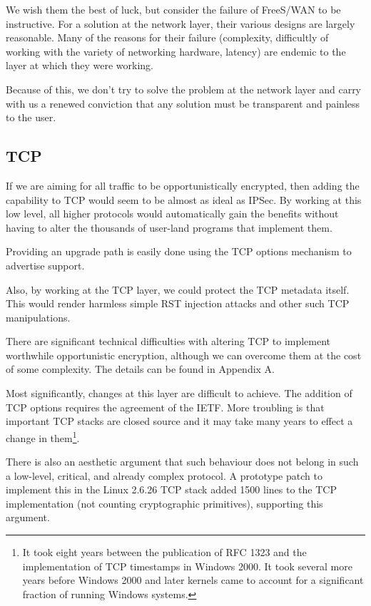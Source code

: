 \documentclass[conference]{IEEEtran}
\begin{document}
We wish them the best of luck, but consider the failure of FreeS/WAN to be
instructive. For a solution at the network layer, their various designs are
largely reasonable. Many of the reasons for their failure (complexity,
difficultly of working with the variety of networking hardware, latency) are
endemic to the layer at which they were working.

Because of this, we don't try to solve the problem at the network layer and
carry with us a renewed conviction that any solution must be transparent and
painless to the user.

\subsection{TCP}

If we are aiming for all traffic to be opportunistically encrypted, then adding
the capability to TCP would seem to be almost as ideal as IPSec. By working at
this low level, all higher protocols would automatically gain the benefits
without having to alter the thousands of user-land programs that implement
them.

Providing an upgrade path is easily done using the TCP options mechanism to
advertise support.

Also, by working at the TCP layer, we could protect the TCP metadata
itself. This would render harmless simple RST injection attacks\cite{comcast}
and other such TCP manipulations.

There are significant technical difficulties with altering TCP to implement
worthwhile opportunistic encryption, although we can overcome them at the cost
of some complexity. The details can be found in Appendix A.

Most significantly, changes at this layer are difficult to achieve. The
addition of TCP options requires the agreement of the IETF.
More troubling is that important TCP stacks are closed source and it may take
many years to effect a change in them\footnote{It took eight years between the
publication of RFC 1323 and the implementation of TCP timestamps in Windows
2000. It took several more years before Windows 2000 and later kernels came to
account for a significant fraction of running Windows systems.}.

There is also an aesthetic argument that such behaviour does not belong in such
a low-level, critical, and already complex protocol. A prototype patch to
implement this in the Linux 2.6.26 TCP stack added 1500 lines to the TCP
implementation (not counting cryptographic primitives), supporting this
argument.
\end{document}
